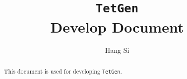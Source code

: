 \documentclass[a4paper,11pt]{report}
\begin{document}
\title{{\tt TetGen}\\ Develop Document}
\author{Hang Si}
\maketitle
\begin{abstract}\centering
This document is used for developing {\tt TetGen}.
\end{abstract}
\tableofcontents


\end{document}
